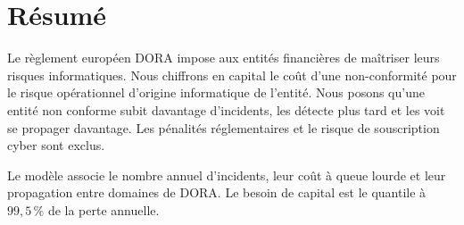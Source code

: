 
\chapter*{Résumé}

Le règlement européen DORA impose aux entités financières de maîtriser leurs risques
informatiques. Nous chiffrons en capital le coût d'une non-conformité pour le risque opérationnel d'origine
informatique de l'entité. Nous posons qu'une entité non conforme subit davantage d'incidents, les détecte plus tard et les voit se propager davantage. Les pénalités réglementaires et le risque de souscription cyber sont exclus.

Le modèle associe le nombre annuel d'incidents, leur coût à queue lourde et leur propagation entre domaines de DORA. Le besoin de capital est le quantile à $99{,}5\,\%$ de la perte annuelle.

